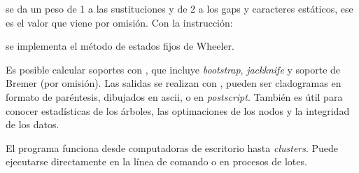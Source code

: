 se da un peso de 1 a las sustituciones y de 2 a los gaps y caracteres est\'aticos, ese es el valor que viene por omisi\'on. Con  la instrucci\'on:


se implementa el m\'etodo de estados fijos de Wheeler.


Es posible calcular soportes con 
, 
que incluye \textit{bootstrap}, \textit{jackknife} y soporte de Bremer (por omisi\'on). Las salidas se realizan con 
, 
 pueden ser cladogramas en formato de par\'entesis, dibujados en ascii, o en \textit{postscript}. Tambi\'en es \'util para conocer estad\'isticas de los \'arboles, las optimaciones de los nodos y la integridad de los datos.
 
El programa funciona desde computadoras de escritorio hasta \textit{clusters}. Puede ejecutarse directamente en la l\'inea de comando o en procesos de lotes.
